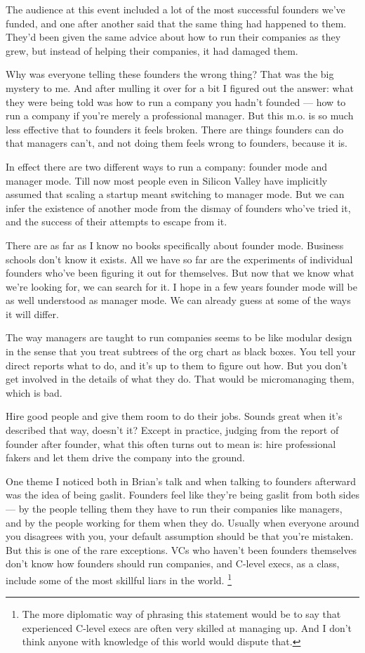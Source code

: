 \documentclass[12pt]{book}
\begin{document}
The audience at this event included a lot of the most successful
founders we've funded, and one after another said that the same thing
had happened to them. They'd been given the same advice about how to run
their companies as they grew, but instead of helping their companies, it
had damaged them.

Why was everyone telling these founders the wrong thing? That was the
big mystery to me. And after mulling it over for a bit I figured out the
answer: what they were being told was how to run a company you hadn't
founded --- how to run a company if you're merely a professional
manager. But this m.o. is so much less effective that to founders it
feels broken. There are things founders can do that managers can't, and
not doing them feels wrong to founders, because it is.

In effect there are two different ways to run a company: founder mode
and manager mode. Till now most people even in Silicon Valley have
implicitly assumed that scaling a startup meant switching to manager
mode. But we can infer the existence of another mode from the dismay of
founders who've tried it, and the success of their attempts to escape
from it.

There are as far as I know no books specifically about founder mode.
Business schools don't know it exists. All we have so far are the
experiments of individual founders who've been figuring it out for
themselves. But now that we know what we're looking for, we can search
for it. I hope in a few years founder mode will be as well understood as
manager mode. We can already guess at some of the ways it will differ.

The way managers are taught to run companies seems to be like modular
design in the sense that you treat subtrees of the org chart as black
boxes. You tell your direct reports what to do, and it's up to them to
figure out how. But you don't get involved in the details of what they
do. That would be micromanaging them, which is bad.

Hire good people and give them room to do their jobs. Sounds great when
it's described that way, doesn't it? Except in practice, judging from
the report of founder after founder, what this often turns out to mean
is: hire professional fakers and let them drive the company into the
ground.

One theme I noticed both in Brian's talk and when talking to founders
afterward was the idea of being gaslit. Founders feel like they're being
gaslit from both sides --- by the people telling them they have to run
their companies like managers, and by the people working for them when
they do. Usually when everyone around you disagrees with you, your
default assumption should be that you're mistaken. But this is one of
the rare exceptions. VCs who haven't been founders themselves don't know
how founders should run companies, and C-level execs, as a class,
include some of the most skillful liars in the world.
\footnote{The more diplomatic way of phrasing this statement would be to
say that experienced C-level execs are often very skilled at managing
up. And I don't think anyone with knowledge of this world would dispute
that.}
\end{document}
